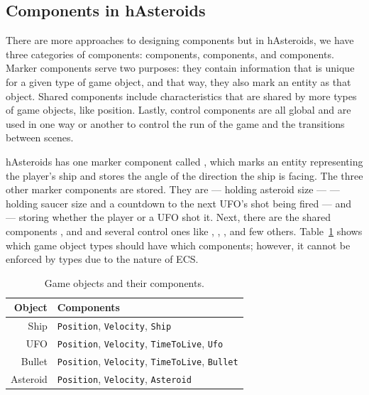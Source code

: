 \documentclass[
  digital, %
  color,   %
  table,   %
  oneside, %
  lof,     %
  lot,     %
]{fithesis3}
\begin{document}
\subsection{Components in hAsteroids}
There are more approaches to designing components but in hAsteroids,
we have three categories of components:  components,
 components, and  components. Marker components serve two purposes:
they contain information that is unique for a given type of game object,
and that way, they also mark an entity as that object.
Shared components include characteristics that are shared by more types
of game objects, like position. Lastly, control components are all global
and are used in one way or another to control the run of the game and the transitions between scenes.

hAsteroids has one  marker component called ,
which marks an entity representing the player's ship and stores
the angle of the direction the ship is facing. The three other marker
components are  stored. They are  — holding
asteroid size —  — holding saucer size and a countdown
to the next UFO's shot being fired — and  — storing whether
the player or a UFO shot it. Next, there are the shared components
,  and 
and several  control ones like ,
, ,  and few others.
Table~\ref{tab:entities} shows which game object types should have which components;
however, it cannot be enforced by types due to the nature of ECS.

\begin{table}[hbt]
  \begin{tabularx}{\textwidth}{|r|X|}
    \toprule
    Object & Components \\
    \midrule
    Ship     & \texttt{Position}, \texttt{Velocity}, \texttt{Ship} \\
    UFO      & \texttt{Position}, \texttt{Velocity}, \texttt{TimeToLive}, \texttt{Ufo} \\
    Bullet   & \texttt{Position}, \texttt{Velocity}, \texttt{TimeToLive}, \texttt{Bullet} \\
    Asteroid & \texttt{Position}, \texttt{Velocity}, \texttt{Asteroid} \\
    \bottomrule
  \end{tabularx}
  \caption{Game objects and their components.}
  \label{tab:entities}
\end{table}
\end{document}

